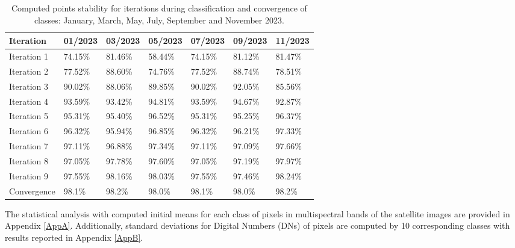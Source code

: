 \documentclass[geomatics,article,accept,pdftex,oneauthor]{Definitions/mdpi}
\begin{document}
\begin{table}[H]
\caption{Computed points stability for iterations during classification and convergence of classes: January, March, May, July, September and November 2023.}\label{tab05}
\begin{tabularx}{\textwidth}{p{1.7cm}  XX  X  X  X X }
  \toprule
   Iteration & 01/2023 & 03/2023 & 05/2023 & 07/2023 & 09/2023 & 11/2023  \\
   \midrule
    Iteration 1 & 74.15\% & 81.46\% & 58.44\% & 74.15\% & 81.12\% & 81.47\% \\
    Iteration 2 & 77.52\% & 88.60\% & 74.76\% & 77.52\% & 88.74\% & 78.51\% \\
    Iteration 3 & 90.02\% & 88.06\% & 89.85\% & 90.02\% & 92.05\% & 85.56\% \\
    Iteration 4 & 93.59\% & 93.42\% & 94.81\% & 93.59\% & 94.67\% & 92.87\% \\
    Iteration 5 & 95.31\% & 95.40\% & 96.52\% & 95.31\% & 95.25\% & 96.37\% \\
    Iteration 6 & 96.32\% & 95.94\% & 96.85\% & 96.32\% & 96.21\% & 97.33\% \\
    Iteration 7 & 97.11\% & 96.88\% & 97.34\% & 97.11\% & 97.09\% & 97.66\% \\
    Iteration 8 & 97.05\% & 97.78\% & 97.60\% & 97.05\% & 97.19\% & 97.97\% \\
    Iteration 9 & 97.55\% & 98.16\% & 98.03\% & 97.55\% & 97.46\% & 98.24\% \\
    \midrule
    Convergence & 98.1\% & 98.2\% & 98.0\% & 98.1\% & 98.0\% & 98.2\% \\
    \bottomrule
\end{tabularx}

\end{table}

The statistical analysis with computed initial means for each class of pixels in multispectral bands of the satellite images are provided in Appendix \ref{AppA}. Additionally, standard deviations for Digital Numbers (DNs) of pixels are computed by 10 corresponding classes with results reported in Appendix \ref{AppB}.
\end{document}
